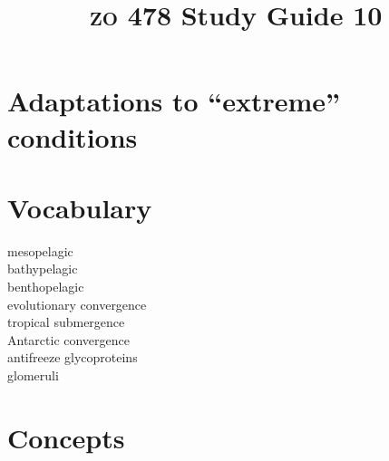\documentclass[letterpaper]{tufte-handout}
\title{{\scshape zo} 478 Study Guide 10}
\date{} %
\begin{document}
\maketitle	%

\section*{Adaptations to “extreme” conditions}


\section{Vocabulary} 
\vspace{-1\baselineskip}
\begin{multicols}{2}
mesopelagic \\
bathypelagic \\
benthopelagic \\
evolutionary convergence \\
tropical submergence \\
Antarctic convergence \\
antifreeze glycoproteins \\
glomeruli 
\end{multicols}

\section{Concepts}
\end{document}
